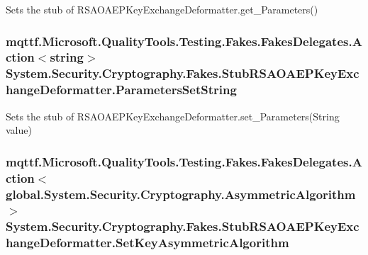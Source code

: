 Sets the stub of R\-S\-A\-O\-A\-E\-P\-Key\-Exchange\-Deformatter.\-get\-\_\-\-Parameters()

\hypertarget{class_system_1_1_security_1_1_cryptography_1_1_fakes_1_1_stub_r_s_a_o_a_e_p_key_exchange_deformatter_aac36799b1c30324a6e92b8617de4857d}{
\subsubsection[{Parameters\-Set\-String}]{\setlength{\rightskip}{0pt plus 5cm}mqttf.\-Microsoft.\-Quality\-Tools.\-Testing.\-Fakes.\-Fakes\-Delegates.\-Action$<$string$>$ System.\-Security.\-Cryptography.\-Fakes.\-Stub\-R\-S\-A\-O\-A\-E\-P\-Key\-Exchange\-Deformatter.\-Parameters\-Set\-String}}\label{class_system_1_1_security_1_1_cryptography_1_1_fakes_1_1_stub_r_s_a_o_a_e_p_key_exchange_deformatter_aac36799b1c30324a6e92b8617de4857d}


Sets the stub of R\-S\-A\-O\-A\-E\-P\-Key\-Exchange\-Deformatter.\-set\-\_\-\-Parameters(\-String value)

\hypertarget{class_system_1_1_security_1_1_cryptography_1_1_fakes_1_1_stub_r_s_a_o_a_e_p_key_exchange_deformatter_a69741e683c1cad48e8f0f8e54dbaadbc}{
\subsubsection[{Set\-Key\-Asymmetric\-Algorithm}]{\setlength{\rightskip}{0pt plus 5cm}mqttf.\-Microsoft.\-Quality\-Tools.\-Testing.\-Fakes.\-Fakes\-Delegates.\-Action$<$global.\-System.\-Security.\-Cryptography.\-Asymmetric\-Algorithm$>$ System.\-Security.\-Cryptography.\-Fakes.\-Stub\-R\-S\-A\-O\-A\-E\-P\-Key\-Exchange\-Deformatter.\-Set\-Key\-Asymmetric\-Algorithm}}\label{class_system_1_1_security_1_1_cryptography_1_1_fakes_1_1_stub_r_s_a_o_a_e_p_key_exchange_deformatter_a69741e683c1cad48e8f0f8e54dbaadbc}


